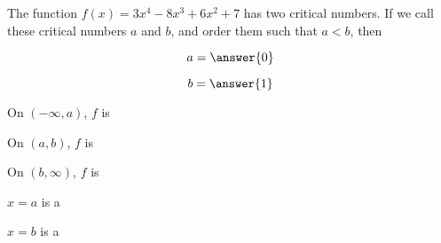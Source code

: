 \documentclass{ximera}
\author{Steven Gubkin}
\begin{document}
\begin{exercise}

The function $f(x) = 3x^4-8x^3+6x^2+7$ has two critical numbers.  If we
call these critical numbers $a$ and $b$, and order them such that $a <
b $, then

$$
a = \answer{0}
$$

$$
b=\answer{1}
$$



On $(-\infty,a)$, $f$ is 

On $(a,b)$, $f$ is 

On $(b,\infty)$, $f$ is 


$x=a$ is a 

$x=b$ is a 


\end{exercise}
\end{document}
